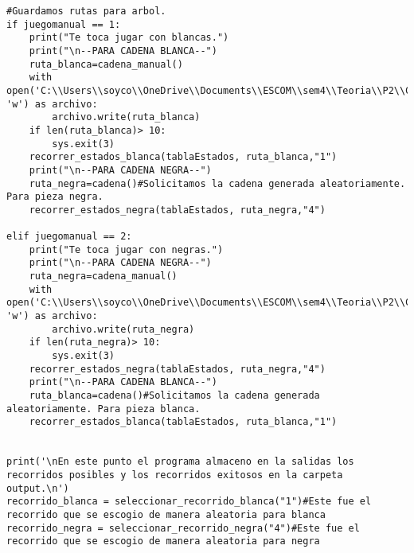 \begin{lstlisting}
#Guardamos rutas para arbol.
if juegomanual == 1:
    print("Te toca jugar con blancas.")
    print("\n--PARA CADENA BLANCA--")
    ruta_blanca=cadena_manual()
    with open('C:\\Users\\soyco\\OneDrive\\Documents\\ESCOM\\sem4\\Teoria\\P2\\Chess\\output\\ruta_blanca.txt', 'w') as archivo:
        archivo.write(ruta_blanca)
    if len(ruta_blanca)> 10:
        sys.exit(3)
    recorrer_estados_blanca(tablaEstados, ruta_blanca,"1")
    print("\n--PARA CADENA NEGRA--")
    ruta_negra=cadena()#Solicitamos la cadena generada aleatoriamente. Para pieza negra.    
    recorrer_estados_negra(tablaEstados, ruta_negra,"4")
    
elif juegomanual == 2:
    print("Te toca jugar con negras.")
    print("\n--PARA CADENA NEGRA--")
    ruta_negra=cadena_manual()
    with open('C:\\Users\\soyco\\OneDrive\\Documents\\ESCOM\\sem4\\Teoria\\P2\\Chess\\output\\ruta_negra.txt', 'w') as archivo:
        archivo.write(ruta_negra)
    if len(ruta_negra)> 10:
        sys.exit(3)
    recorrer_estados_negra(tablaEstados, ruta_negra,"4")
    print("\n--PARA CADENA BLANCA--")
    ruta_blanca=cadena()#Solicitamos la cadena generada aleatoriamente. Para pieza blanca.
    recorrer_estados_blanca(tablaEstados, ruta_blanca,"1")


print('\nEn este punto el programa almaceno en la salidas los recorridos posibles y los recorridos exitosos en la carpeta output.\n')
recorrido_blanca = seleccionar_recorrido_blanca("1")#Este fue el recorrido que se escogio de manera aleatoria para blanca
recorrido_negra = seleccionar_recorrido_negra("4")#Este fue el recorrido que se escogio de manera aleatoria para negra


\end{lstlisting}
